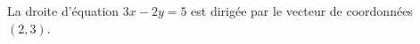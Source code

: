 La droite d'équation $3x-2y=5$ est dirigée par le vecteur de coordonnées $(2,3)$.

\begin{reponses}
\end{reponses}

